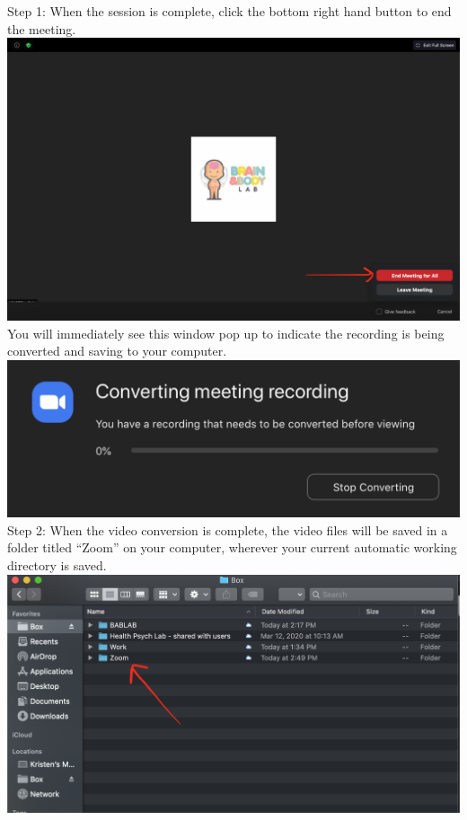 \documentclass[]{book}
\begin{document}
Step 1:
When the session is complete, click the bottom right hand button to end the meeting. \includegraphics{images/zoom_parent_child_interaction/7.png} You will immediately see this window pop up to indicate the recording is being converted and saving to your computer. \includegraphics{images/zoom_parent_child_interaction/8.png}
Step 2:
When the video conversion is complete, the video files will be saved in a folder titled ``Zoom'' on your computer, wherever your current automatic working directory is saved. \includegraphics{images/zoom_parent_child_interaction/9.png}
\end{document}
